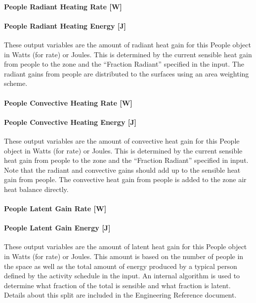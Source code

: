 \paragraph{People Radiant Heating Rate {[}W{]}}\label{people-radiant-heating-rate-w}

\paragraph{People Radiant Heating Energy {[}J{]}}\label{people-radiant-heating-energy-j}

These output variables are the amount of radiant heat gain for this People object in Watts (for rate) or Joules. This is determined by the current sensible heat gain from people to the zone and the ``Fraction Radiant'' specified in the input. The radiant gains from people are distributed to the surfaces using an area weighting scheme.

\paragraph{People Convective Heating Rate {[}W{]}}\label{people-convective-heating-rate-w}

\paragraph{People Convective Heating Energy {[}J{]}}\label{people-convective-heating-energy-j}

These output variables are the amount of convective heat gain for this People object in Watts (for rate) or Joules. This is determined by the current sensible heat gain from people to the zone and the ``Fraction Radiant'' specified in input. Note that the radiant and convective gains should add up to the sensible heat gain from people. The convective heat gain from people is added to the zone air heat balance directly.

\paragraph{People Latent Gain Rate {[}W{]}}\label{people-latent-gain-rate-w}

\paragraph{People Latent Gain Energy {[}J{]}}\label{people-latent-gain-energy-j}

These output variables are the amount of latent heat gain for this People object in Watts (for rate) or Joules. This amount is based on the number of people in the space as well as the total amount of energy produced by a typical person defined by the activity schedule in the input. An internal algorithm is used to determine what fraction of the total is sensible and what fraction is latent. Details about this split are included in the Engineering Reference document.

